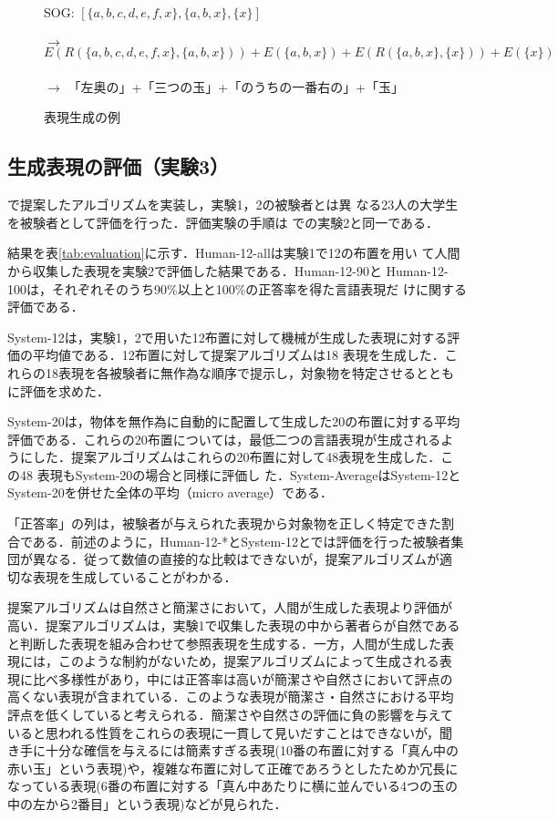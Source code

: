 \documentclass{nlp}
\begin{document}
\begin{figure}[tb]
  \quad\quad\quad SOG: $[\{a,b,c,d,e,f,x\},\{a,b,x\},\{x\}]$\\
  \\
  \quad\quad$\to$
  $E(R(\{a,b,c,d,e,f,x\},\{a,b,x\}))+E(\{a,b,x\})+E(R(\{a,b,x\},\{x\}))+E(\{x\})$\\
  \\
  \quad\quad$\to$
  「左奥の」+「三つの玉」+「のうちの一番右の」+「玉」
\caption{表現生成の例}
\label{fig:realization}
\end{figure}

\subsection{生成表現の評価（実験3）}
\label{sec:evaluation}

で提案したアルゴリズムを実装し，実験1，2の被験者とは異
なる23人の大学生を被験者として評価を行った．評価実験の手順は
での実験2と同一である．

結果を表\ref{tab:evaluation}に示す．Human-12-allは実験1で12の布置を用い
て人間から収集した表現を実験2で評価した結果である．Human-12-90と
Human-12-100は，それぞれそのうち90\%以上と100\%の正答率を得た言語表現だ
けに関する評価である．

System-12は，実験1，2で用いた12布置に対して機械が生成した表現に対する評
価の平均値である．12布置に対して提案アルゴリズムは18 表現を生成した．こ
れらの18表現を各被験者に無作為な順序で提示し，対象物を特定させるととも
に評価を求めた．

System-20は，物体を無作為に自動的に配置して生成した20の布置に対する平均
評価である．これらの20布置については，最低二つの言語表現が生成されるよ
うにした．提案アルゴリズムはこれらの20布置に対して48表現を生成した．こ
の48 表現もSystem-20の場合と同様に評価し
た．System-AverageはSystem-12とSystem-20を併せた全体の平均（micro
average）である．

「正答率」の列は，被験者が与えられた表現から対象物を正しく特定できた割
合である．前述のように，Human-12-*とSystem-12とでは評価を行った被験者集
団が異なる．従って数値の直接的な比較はできないが，提案アルゴリズムが適
切な表現を生成していることがわかる．

提案アルゴリズムは自然さと簡潔さにおいて，人間が生成した表現より評価が
高い．提案アルゴリズムは，実験1で収集した表現の中から著者らが自然である
と判断した表現を組み合わせて参照表現を生成する．一方，人間が生成した表
現には，このような制約がないため，提案アルゴリズムによって生成される表
現に比べ多様性があり，中には正答率は高いが簡潔さや自然さにおいて評点の
高くない表現が含まれている．このような表現が簡潔さ・自然さにおける平均
評点を低くしていると考えられる．簡潔さや自然さの評価に負の影響を与えて
いると思われる性質をこれらの表現に一貫して見いだすことはできないが，聞
き手に十分な確信を与えるには簡素すぎる表現(10番の布置に対する「真ん中の
赤い玉」という表現)や，複雑な布置に対して正確であろうとしたためか冗長に
なっている表現(6番の布置に対する「真ん中あたりに横に並んでいる4つの玉の
中の左から2番目」という表現)などが見られた．
\end{document}
